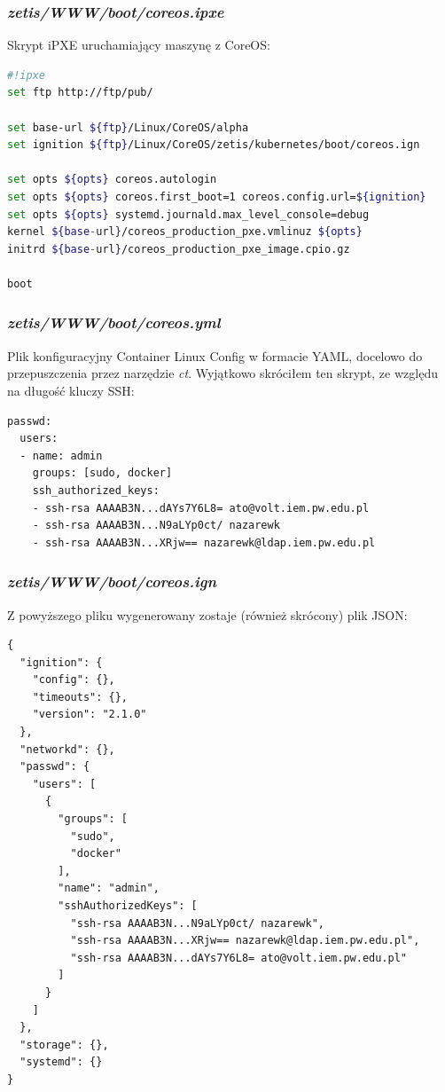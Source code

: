 \documentclass[a4paper,12pt,twoside,openany]{report}
\begin{document}
\newpage

\hypertarget{zetiswwwbootcoreos.ipxe}{%
\subsubsection{\texorpdfstring{\emph{zetis/WWW/boot/coreos.ipxe}}{zetis/WWW/boot/coreos.ipxe}}\label{zetiswwwbootcoreos.ipxe}}

Skrypt iPXE uruchamiający maszynę z CoreOS:

\begin{lstlisting}[language=bash]
#!ipxe
set ftp http://ftp/pub/

set base-url ${ftp}/Linux/CoreOS/alpha
set ignition ${ftp}/Linux/CoreOS/zetis/kubernetes/boot/coreos.ign

set opts ${opts} coreos.autologin
set opts ${opts} coreos.first_boot=1 coreos.config.url=${ignition}
set opts ${opts} systemd.journald.max_level_console=debug
kernel ${base-url}/coreos_production_pxe.vmlinuz ${opts}
initrd ${base-url}/coreos_production_pxe_image.cpio.gz

boot
\end{lstlisting}

\newpage

\hypertarget{zetiswwwbootcoreos.yml}{%
\subsubsection{\texorpdfstring{\emph{zetis/WWW/boot/coreos.yml}}{zetis/WWW/boot/coreos.yml}}\label{zetiswwwbootcoreos.yml}}

Plik konfiguracyjny Container Linux Config w formacie YAML, docelowo do
przepuszczenia przez narzędzie \emph{ct}. Wyjątkowo skróciłem ten
skrypt, ze względu na długość kluczy SSH:

\begin{lstlisting}
passwd:
  users:
  - name: admin
    groups: [sudo, docker]
    ssh_authorized_keys:
    - ssh-rsa AAAAB3N...dAYs7Y6L8= ato@volt.iem.pw.edu.pl
    - ssh-rsa AAAAB3N...N9aLYp0ct/ nazarewk
    - ssh-rsa AAAAB3N...XRjw== nazarewk@ldap.iem.pw.edu.pl
\end{lstlisting}

\hypertarget{zetiswwwbootcoreos.ign}{%
\subsubsection{\texorpdfstring{\emph{zetis/WWW/boot/coreos.ign}}{zetis/WWW/boot/coreos.ign}}\label{zetiswwwbootcoreos.ign}}

Z powyższego pliku wygenerowany zostaje (również skrócony) plik JSON:

\begin{lstlisting}
{
  "ignition": {
    "config": {},
    "timeouts": {},
    "version": "2.1.0"
  },
  "networkd": {},
  "passwd": {
    "users": [
      {
        "groups": [
          "sudo",
          "docker"
        ],
        "name": "admin",
        "sshAuthorizedKeys": [
          "ssh-rsa AAAAB3N...N9aLYp0ct/ nazarewk",
          "ssh-rsa AAAAB3N...XRjw== nazarewk@ldap.iem.pw.edu.pl",
          "ssh-rsa AAAAB3N...dAYs7Y6L8= ato@volt.iem.pw.edu.pl"
        ]
      }
    ]
  },
  "storage": {},
  "systemd": {}
}
\end{lstlisting}
\end{document}
